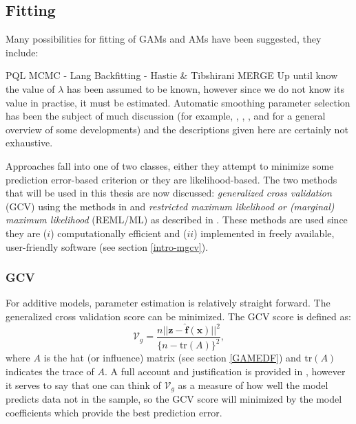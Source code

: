 \subsection{Fitting}
\label{GAMfitting}

Many possibilities for fitting of GAMs and AMs have been suggested, they include:

PQL
MCMC - Lang
Backfitting - Hastie \& Tibshirani
MERGE
Up until know the value of $\lambda$ has been assumed to be known, however since we do not know its value in practise, it must be estimated. Automatic smoothing parameter selection has been the subject of much discussion (for example, \cite{wood2000}, \cite{wood2004}, \cite{wood2008}, \cite{gammonograph} and \cite{ruppertreview} for a general overview of some developments) and the descriptions given here are certainly not exhaustive. 

Approaches fall into one of two classes, either they attempt to minimize some prediction error-based criterion or they are likelihood-based. The two methods that will be used in this thesis are now discussed: \textit{generalized cross validation} (GCV) using the methods in and \textit{restricted maximum likelihood or (marginal) maximum likelihood} (REML/ML) as described in . These methods are used since they are ($i$) computationally efficient and ($ii$) implemented in freely available, user-friendly software (see section \ref{intro-mgcv}).

\subsubsection{GCV}
\label{GAMGCV}

For additive models, parameter estimation is relatively straight forward. The generalized cross validation score can be minimized. The GCV score is defined as:
\begin{equation}
\mathcal{V}_g = \frac{n \lvert\lvert \mathbf{z} - \mathbf{\hat{f}}(\mathbf{x})\rvert \rvert^2}{\{n-\text{tr}(A)\}^2},
\label{intro-GCV}
\end{equation}
where $A$ is the hat (or influence) matrix (see section \ref{GAMEDF}) and $\text{tr}(A)$ indicates the trace of $A$. A full account and justification is provided in , however it serves to say that one can think of $\mathcal{V}_g$ as a measure of how well the model predicts data not in the sample, so the GCV score will minimized by the model coefficients which provide the best prediction error. 

